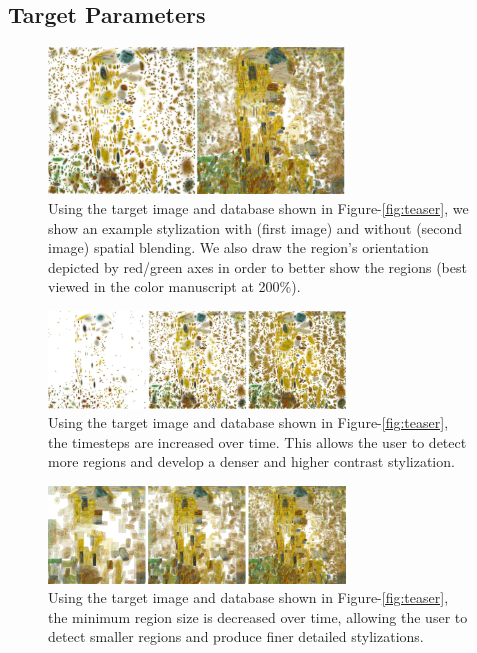 \documentclass[a4paper,10pt,final]{ThesisStyle}
\begin{document}
\subsection{Target Parameters}\vspace{-0.4em}
\begin{figure}[ht]
  \centering
  \includegraphics[width=3.1in]{images/spatial-blending-3.png}
  
  \caption{Using the target image and database shown in Figure-\ref{fig:teaser}, we show an example stylization with (first image) and without (second image) spatial blending.  We also draw the region's orientation depicted by red/green axes in order to better show the regions (best viewed in the color manuscript at 200\%).}
  \label{fig:spatial-blending}
\end{figure}
\begin{figure}[ht]
  \centering
  \includegraphics[width=3.1in]{images/increasing-timesteps-2.png}
  
  \caption{Using the target image and database shown in Figure-\ref{fig:teaser}, the timesteps are increased over time.  This allows the user to detect more regions and develop a denser and higher contrast stylization.}
  \label{fig:timesteps}
\end{figure}
\begin{figure}[ht]
  \centering
  \includegraphics[width=3.1in]{images/decreasing-minimum-size-2.png}
  
  \caption{Using the target image and database shown in Figure-\ref{fig:teaser}, the minimum region size is decreased over time, allowing the user to detect smaller regions and produce finer detailed stylizations.}
  \label{fig:minimum-size}
\end{figure}
\end{document}
